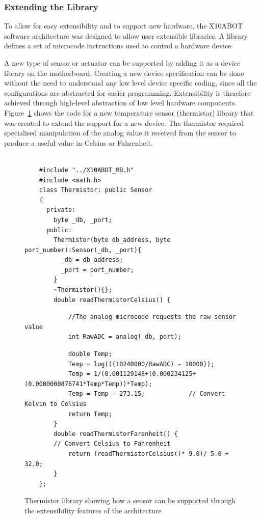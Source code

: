 	\subsubsection{Extending the Library} %
	\label{ssub:extending_the_library}
	
	To allow for easy extensibility and to support new hardware, the X10ABOT software architecture was designed to allow user extensible libraries. A library defines a set of microcode instructions used to control a hardware device.
	
	A new type of sensor or actuator can be supported by adding it as a device library on the \xten motherboard. Creating a new device specification can be done without the need to understand any low level device specific coding, since all the configurations are abstracted for easier programming. Extensibility is therefore achieved through high-level abstraction of low level hardware components.
    Figure~\ref{code:extlib} shows the code for a new temperature sensor (thermistor) library that was created to extend the \xten support for a new device. The thermistor required specialised manipulation of the analog value it received from the sensor to produce a useful value in Celsius or Fahrenheit.
    
    \begin{figure}
    \footnotesize
    {\fontsize{8}{6}\selectfont
    \begin{verbatim}

    #include "../X10ABOT_MB.h"
    #include <math.h>
    class Thermistor: public Sensor
    {
      private:
        byte _db, _port;
      public:
        Thermistor(byte db_address, byte port_number):Sensor(_db, _port){
          _db = db_address;
          _port = port_number;
        }
        ~Thermistor(){};
        double readThermistorCelsius() {
        \end{verbatim}
        \begin{verbatim}
            //The analog microcode requests the raw sensor value
            int RawADC = analog(_db,_port); 
        \end{verbatim}
        \begin{verbatim}
            double Temp;
            Temp = log(((10240000/RawADC) - 10000));
            Temp = 1/(0.001129148+(0.000234125+(0.0000000876741*Temp*Temp))*Temp);
            Temp = Temp - 273.15;            // Convert Kelvin to Celsius
            return Temp;
        }
        double readThermistorFarenheit() {
        // Convert Celsius to Fahrenheit
            return (readThermistorCelsius()* 9.0)/ 5.0 + 32.0;
        }
    };

    \end{verbatim}
    }
    \caption{Thermistor library showing how a sensor can be supported through the extensibility features of the \xten architecture} \label{code:extlib}
    \end{figure}
    
